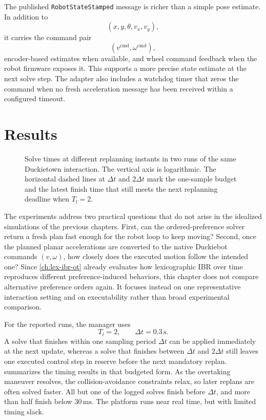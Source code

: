 The published \texttt{RobotStateStamped} message is richer than a simple pose estimate.
In addition to
\[
(x,y,\theta,v_x,v_y),
\]
it carries the command pair
\[
(v^{\mathrm{cmd}},\omega^{\mathrm{cmd}}),
\]
encoder-based estimates when available, and wheel
command feedback when the robot firmware exposes it. This supports a more precise state estimate
at the next solve step.
The adapter also includes a watchdog timer that zeros the command when no fresh acceleration message has been
received within a configured timeout.



\section{Results}
\label{sec:duckietown-results}

\begin{figure}[t]
    \centering
    
    \caption{Solve times at different replanning instants in two runs of the same Duckietown interaction.
    The vertical axis is logarithmic. The horizontal dashed lines at \(\Delta t\)
    and \(2\Delta t\) mark the one-sample budget and the latest finish time that still meets the next replanning
    deadline when \(T_l = 2\).}
    \label{fig:duckietown_solve_times}
\end{figure}

The experiments address two practical questions that do not arise in the idealized simulations of the
previous chapters.
First, can the ordered-preference solver return a fresh plan fast enough for the robot loop to keep moving?
Second, once the planned planar accelerations are converted to the native Duckiebot commands \((v,\omega)\), how
closely does the executed motion follow the intended one?
Since \cref{ch:lex-ibr-ot} already evaluates how lexicographic IBR over time reproduces different
preference-induced behaviors, this chapter does not compare alternative preference orders again.
It focuses instead on one representative interaction setting and on executability rather than broad
experimental comparison.

For the reported runs, the manager uses
\[
T_l = 2,\qquad \Delta t = 0.3\,\mathrm{s}.
\]
A solve that finishes within one sampling period \(\Delta t\) can be applied immediately at the next update, whereas
a solve that finishes between \(\Delta t\) and \(2\Delta t\) still leaves one executed control step in reserve before
the next mandatory replan.
 summarizes the timing results in that budgeted form.
As the overtaking maneuver resolves, the collision-avoidance constraints relax, so later replans are often
solved faster.
All but one of the logged solves finish before \(\Delta t\), and more than half finish below \(30\,\mathrm{ms}\).
The platform runs near real time, but with limited timing slack.

